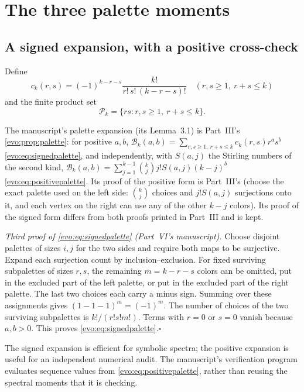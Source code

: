 \documentclass[11pt,a4paper]{article}
\numberwithin{equation}{section}
\theoremstyle{definition}
\theoremstyle{remark}
\newcommand{\Bip}{\mathcal B}
\begin{document}
\section{The three palette moments}\label{sc:sec:moments}

\subsection{A signed expansion, with a positive cross-check}
Define
\begin{equation}\label{sc:eq:coefficient}
 c_k(r,s)=(-1)^{k-r-s}\frac{k!}{r!\,s!\,(k-r-s)!}
 \quad(r,s\ge1,\ r+s\le k)
\end{equation}
and the finite product set
\begin{equation}\label{sc:eq:productset}
 \mathcal P_k=\{rs:r,s\ge1,\ r+s\le k\}.
\end{equation}

The manuscript's palette expansion (its Lemma~3.1) is Part~III's
\cref{evo:prop:palette}: for positive $a,b$,
$\Bip_k(a,b)=\sum_{r,s\ge1,\ r+s\le k}c_k(r,s)r^as^b$
\eqref{evo:eq:signedpalette}, and independently, with $S(a,j)$ the Stirling
numbers of the second kind,
$\Bip_k(a,b)=\sum_{j=1}^{k-1}\binom kj j!S(a,j)(k-j)^b$
\eqref{evo:eq:positivepalette}. Its proof of the positive form is
Part~III's (choose the exact palette used on the left side: $\binom kj$
choices and $j!S(a,j)$ surjections onto it, and each vertex on the right
can use any of the other $k-j$ colors). Its proof of the signed form
differs from both proofs printed in Part~III and is kept.

\noindent\emph{Third proof of \eqref{evo:eq:signedpalette} (Part~VI's
manuscript).} Choose disjoint palettes of
sizes $i,j$ for the two sides and require both maps to be surjective.
Expand each surjection count by inclusion--exclusion. For fixed surviving
subpalettes of sizes $r,s$, the remaining $m=k-r-s$ colors can be omitted,
put in the excluded part of the left palette, or put in the excluded part
of the right palette. The last two choices each carry a minus sign.
Summing over these assignments gives $(1-1-1)^m=(-1)^m$. The number of
choices of the two surviving subpalettes is
$k!/(r!s!m!)$. Terms with $r=0$ or $s=0$ vanish because $a,b>0$.
This proves \eqref{evo:eq:signedpalette}.\hfill$\square$

The signed expansion is efficient for symbolic spectra; the positive
expansion is useful for an independent numerical audit. The manuscript's
verification program evaluates sequence values from \eqref{evo:eq:positivepalette}, rather than
reusing the spectral moments that it is checking.
\end{document}
